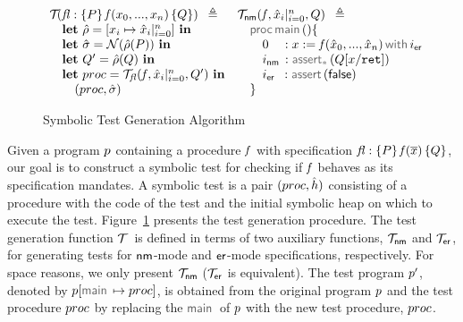 \begin{figure}
{\footnotesize
$$
\begin{array}{lll}
\testify{}(\specsig{P}{\pid(\jvar_0, ..., \jvar_n)}{Q}{\flag}) \ \semeq                           &  \testify{\fnormal}(\pid, \svar_i|_{i=0}^n, Q) \ \semeq \\
%
\quad  \mathbf{let} \ \sstore =  [ \jvar_i \mapsto \svar_i|_{i=0}^n] \ \mathbf{in}        &  \quad \darkmath{\sf proc} \jsilmain () \{    \\
%
\quad  \mathbf{let} \ \sstate = \normaliser(\sstore(P)) \ \mathbf{in}                               &   \qquad 0_{\phantom{\sf nm}}: \jsilcall{\jvar}{\pid}{\svar_0, ..., \svar_n}{\errlab} \\
\quad  \mathbf{let} \ Q' = \sstore(Q) \ \mathbf{in}                                                           &  \qquad \retlab \, : \sepassert(Q[\jvar/\retvar])  \\
\quad  \mathbf{let} \ \proc = \testify{\flag}(\pid, \svar_i|_{i=0}^n, Q')  \ \mathbf{in}  &    \qquad \errlab \, \, \, : \jassert(\jfalse)   \\
\qquad (\proc, \sstate)                                                                                                 &  \quad \}  
\end{array}
$$}
\vspace*{-0.4cm}
\caption{\small Symbolic Test Generation Algorithm~\label{fig:test:generation}}
\vspace*{-0.6cm}
\end{figure}

Given a \jsil program $p$ containing a procedure $\mathit{f}$ with specification {\small ${\mathit{fl}} : \{ P \} \, \mathit{f}(\overline{x}) \, \{ Q \}$}, 
our goal is to construct a symbolic test for checking if $\mathit{f}$ behaves as its specification mandates.
A symbolic test is a pair $(proc, \hat{h})$ consisting of a \jsil procedure with the code of the test and the initial 
symbolic heap on which to execute the test. 
%
Figure~\ref{fig:test:generation} presents the test generation procedure. 
The test generation function $\mathcal{T}_{} \ $ is defined in terms 
of two auxiliary functions, $\mathcal{T}_{{\sf nm}}$ and $\mathcal{T}_{{\sf er}}$, for generating tests for ${\sf nm}$-mode and 
${\sf er}$-mode specifications, respectively. 
For space reasons, we only present $\mathcal{T}_{{\sf nm}}$ ($\mathcal{T}_{{\sf er}}$ is equivalent). 
The test program $p'$, denoted by $\prog[\jsilmain \mapsto \proc]$, is obtained from the original program $p$ and the test procedure $proc$ by replacing the 
$\jsilmain$ of $p$ with the new test procedure, $proc$. 

